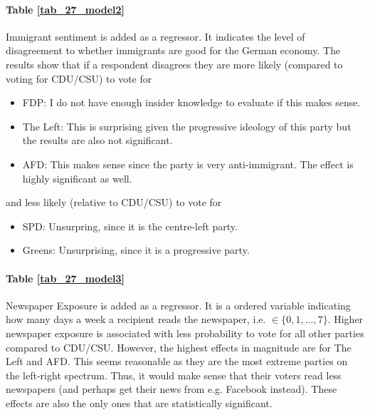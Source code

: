     \paragraph{Table \ref{tab_27_model2}}
    Immigrant sentiment is added as a regressor. It indicates the level of disagreement to whether immigrants are good for the German economy. The results show that if a respondent disagrees they are more likely (compared to voting for CDU/CSU) to vote for
    \begin{itemize}
        \item FDP: I do not have enough insider knowledge to evaluate if this makes sense.
        \item The Left: This is surprising given the progressive ideology of this party but the results are also not significant.
        \item AFD: This makes sense since the party is very anti-immigrant. The effect is highly significant as well.
    \end{itemize}
    and less likely (relative to CDU/CSU) to vote for
    \begin{itemize}
        \item SPD: Unsurpring, since it is the centre-left party.
        \item Greens: Unsurprising, since it is a progressive party.
    \end{itemize}
    
    \paragraph{Table \ref{tab_27_model3}}
    Newspaper Exposure is added as a regressor. It is a ordered variable indicating how many days a week a recipient reads the newspaper, i.e. $\in\{0,1,...,7\}$. Higher newspaper exposure is associated with less probability to vote for all other parties compared to CDU/CSU. However, the highest effects in magnitude are for The Left and AFD. This seems reasonable as they are the most extreme parties on the left-right spectrum. Thus, it would make sense that their voters read less newspapers (and perhaps get their news from e.g. Facebook instead). These effects are also the only ones that are statistically significant.
        
